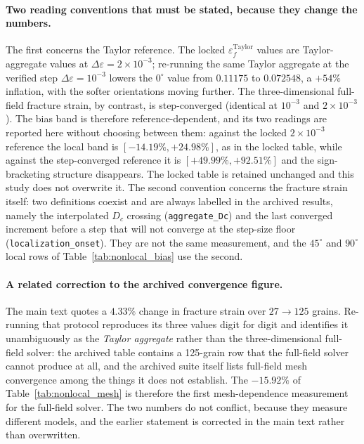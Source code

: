 \documentclass[12pt,a4paper,twocolumn]{article}
\providecommand{\ang}[1]{\ensuremath{#1^{\circ}}}
\begin{document}
\paragraph{Two reading conventions that must be stated, because they change the numbers.} The first concerns the
Taylor reference. The locked $\varepsilon_f^{\mathrm{Taylor}}$ values are Taylor-aggregate values at
$\Delta\varepsilon = 2\times10^{-3}$; re-running the same Taylor aggregate at the verified step
$\Delta\varepsilon = 10^{-3}$ lowers the $\ang{0}$ value from $0.11175$ to $0.072548$, a $+54\%$ inflation, with
the softer orientations moving further. The three-dimensional full-field fracture strain, by contrast, is
step-converged (identical at $10^{-3}$ and $2\times10^{-3}$). The bias band is therefore reference-dependent,
and its two readings are reported here without choosing between them: against the locked $2\times10^{-3}$
reference the local band is $[-14.19\%, +24.98\%]$, as in the locked table, while against the step-converged
reference it is $[+49.99\%, +92.51\%]$ and the sign-bracketing structure disappears. The locked table is
retained unchanged and this study does not overwrite it. The second convention concerns the fracture strain
itself: two definitions coexist and are always labelled in the archived results, namely the interpolated $D_c$
crossing (\texttt{aggregate\_Dc}) and the last converged increment before a step that will not converge at the
step-size floor (\texttt{localization\_onset}). They are not the same measurement, and the $\ang{45}$ and
$\ang{90}$ local rows of Table~\ref{tab:nonlocal_bias} use the second.

\paragraph{A related correction to the archived convergence figure.} The main text quotes a $4.33\%$ change in
fracture strain over $27 \to 125$ grains. Re-running that protocol reproduces its three values digit for digit
and identifies it unambiguously as the \emph{Taylor aggregate} rather than the three-dimensional full-field
solver: the archived table contains a 125-grain row that the full-field solver cannot produce at all, and the
archived suite itself lists full-field mesh convergence among the things it does not establish. The $-15.92\%$
of Table~\ref{tab:nonlocal_mesh} is therefore the first mesh-dependence measurement for the full-field solver.
The two numbers do not conflict, because they measure different models, and the earlier statement is corrected
in the main text rather than overwritten.
\end{document}
